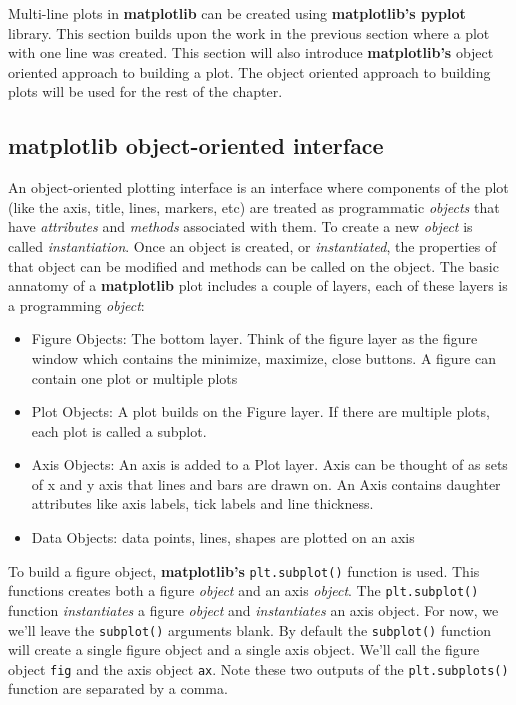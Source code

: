 \documentclass{book}
\providecommand{\tightlist}{%
      \setlength{\itemsep}{0pt}\setlength{\parskip}{0pt}}
\begin{document}
    
        Multi-line plots in \textbf{matplotlib} can be created using
\textbf{matplotlib's pyplot} library. This section builds upon the work
in the previous section where a plot with one line was created. This
section will also introduce \textbf{matplotlib's} object oriented
approach to building a plot. The object oriented approach to building
plots will be used for the rest of the chapter.
    




    
        \subsection{\texorpdfstring{\textbf{matplotlib} object-oriented
interface}{matplotlib object-oriented interface}}\label{matplotlib-object-oriented-interface}

An object-oriented plotting interface is an interface where components
of the plot (like the axis, title, lines, markers, etc) are treated as
programmatic \emph{objects} that have \emph{attributes} and
\emph{methods} associated with them. To create a new \emph{object} is
called \emph{instantiation}. Once an object is created, or
\emph{instantiated}, the properties of that object can be modified and
methods can be called on the object. The basic annatomy of a
\textbf{matplotlib} plot includes a couple of layers, each of these
layers is a programming \emph{object}:

\begin{itemize}
\tightlist
\item
  Figure Objects: The bottom layer. Think of the figure layer as the
  figure window which contains the minimize, maximize, close buttons. A
  figure can contain one plot or multiple plots
\item
  Plot Objects: A plot builds on the Figure layer. If there are multiple
  plots, each plot is called a subplot.
\item
  Axis Objects: An axis is added to a Plot layer. Axis can be thought of
  as sets of x and y axis that lines and bars are drawn on. An Axis
  contains daughter attributes like axis labels, tick labels and line
  thickness.
\item
  Data Objects: data points, lines, shapes are plotted on an axis
\end{itemize}
    




    
        To build a figure object, \textbf{matplotlib's}
\lstinline!plt.subplot()! function is used. This functions creates both
a figure \emph{object} and an axis \emph{object}. The
\lstinline!plt.subplot()! function \emph{instantiates} a figure
\emph{object} and \emph{instantiates} an axis object. For now, we we'll
leave the \lstinline!subplot()! arguments blank. By default the
\lstinline!subplot()! function will create a single figure object and a
single axis object. We'll call the figure object \lstinline!fig! and the
axis object \lstinline!ax!. Note these two outputs of the
\lstinline!plt.subplots()! function are separated by a comma.
\end{document}
